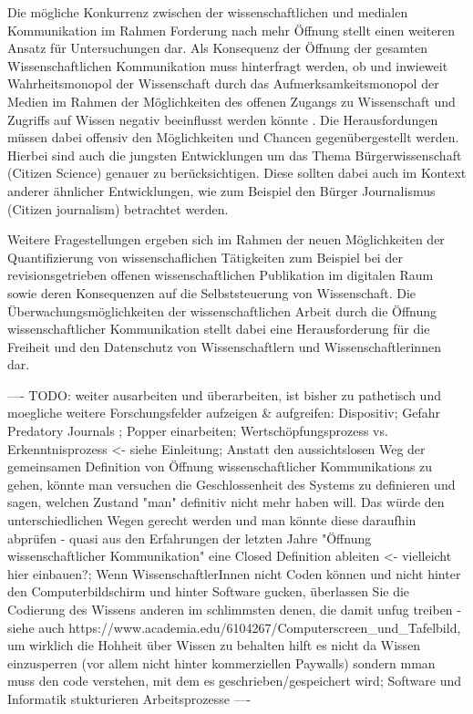 Die mögliche Konkurrenz zwischen der wissenschaftlichen und medialen Kommunikation im Rahmen Forderung nach mehr Öffnung stellt einen weiteren Ansatz für Untersuchungen dar. Als Konsequenz der Öffnung der gesamten Wissenschaftlichen Kommunikation muss hinterfragt werden, ob und inwieweit Wahrheitsmonopol der Wissenschaft durch das Aufmerksamkeitsmonopol der Medien im Rahmen der Möglichkeiten des offenen Zugangs zu Wissenschaft und Zugriffs auf Wissen negativ beeinflusst werden könnte \cite{weingart_2005_wissenschaft}. Die Herausfordungen müssen dabei offensiv den Möglichkeiten und Chancen gegenübergestellt werden. Hierbei sind auch die jungsten Entwicklungen um das Thema Bürgerwissenschaft (Citizen Science) genauer zu berücksichtigen. Diese sollten dabei auch im Kontext anderer ähnlicher Entwicklungen, wie zum Beispiel den Bürger Journalismus (Citizen journalism) betrachtet werden.

Weitere Fragestellungen ergeben sich im Rahmen der neuen Möglichkeiten der Quantifizierung von wissenschaflichen Tätigkeiten zum Beispiel bei der revisionsgetrieben offenen wissenschaftlichen Publikation im digitalen Raum sowie deren Konsequenzen auf die Selbststeuerung von Wissenschaft. Die Überwachungsmöglichkeiten der wissenschaftlichen Arbeit durch die Öffnung wissenschaftlicher Kommunikation stellt dabei eine Herausforderung für die Freiheit und den Datenschutz von Wissenschaftlern und Wissenschaftlerinnen dar.

---- TODO: weiter ausarbeiten und überarbeiten, ist bisher zu pathetisch und moegliche weitere Forschungsfelder aufzeigen & aufgreifen: Dispositiv; Gefahr Predatory Journals \cite{Beall_2012}; Popper einarbeiten; Wertschöpfungsprozess vs. Erkenntnisprozess <- siehe Einleitung; Anstatt den aussichtslosen Weg der gemeinsamen Definition von Öffnung wissenschaftlicher Kommunikations zu gehen, könnte man versuchen die Geschlossenheit des Systems zu definieren und sagen, welchen Zustand "man" definitiv nicht mehr haben will. Das würde den unterschiedlichen Wegen gerecht werden und man könnte diese daraufhin abprüfen - quasi aus den Erfahrungen der letzten Jahre "Öffnung wissenschaftlicher Kommunikation" eine Closed Definition ableiten <- vielleicht hier einbauen?; Wenn WissenschaftlerInnen nicht Coden können und nicht hinter den Computerbildschirm und hinter Software gucken, überlassen Sie die Codierung des Wissens anderen im schlimmsten denen, die damit unfug treiben - siehe auch https://www.academia.edu/6104267/Computerscreen_und_Tafelbild, um wirklich die Hohheit über Wissen zu behalten hilft es nicht da Wissen einzusperren (vor allem nicht hinter kommerziellen Paywalls) sondern mman muss den code verstehen, mit dem es geschrieben/gespeichert wird; Software und Informatik stukturieren Arbeitsprozesse \cite{Warnke_2012}  ----
